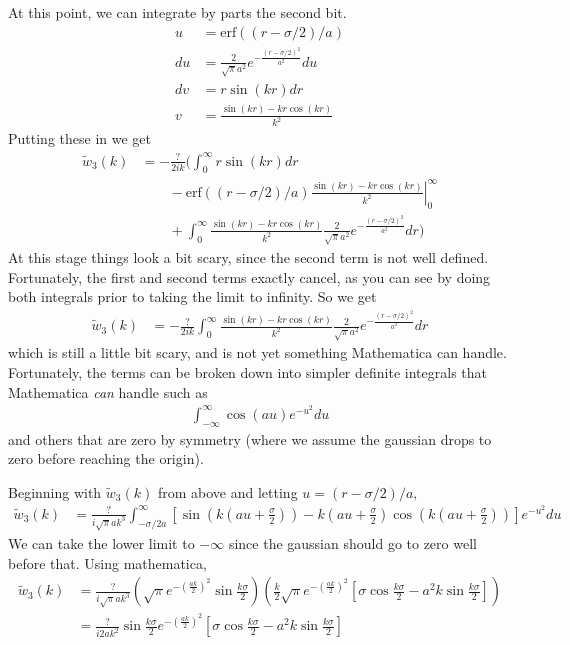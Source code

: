 \documentclass[letterpaper,twocolumn,amsmath,amssymb,prb]{revtex4-1}
\begin{document}
At this point, we can integrate by parts the second bit.
\begin{align}
  u &= \mathrm{erf}((r-\sigma/2)/a) \\
  du &= \frac{2}{\sqrt{\pi}a^2} e^{-\frac{(r-\sigma/2)^2}{a^2}} du \\
  dv &= r \sin(kr) dr \\
  v &= \frac{\sin(kr) - kr \cos(kr)}{k^2}
\end{align}
Putting these in we get
\begin{align}
  \tilde{w}_3(k)
  &=  -\frac{?}{2ik} \Big(
  \int_0^\infty r \sin(kr) dr\\ &\quad\quad
  -
  \left.\mathrm{erf}((r-\sigma/2)/a)\frac{\sin(kr) - kr
    \cos(kr)}{k^2}\right|_0^\infty\\ &\quad\quad
  +
  \int_0^\infty \frac{\sin(kr) - kr \cos(kr)}{k^2}\frac{2}{\sqrt{\pi}a^2} e^{-\frac{(r-\sigma/2)^2}{a^2}} dr
  \Big)
\end{align}
At this stage things look a bit scary, since the second term is not
well defined.  Fortunately, the first and second terms exactly cancel,
as you can see by doing both integrals prior to taking the limit to
infinity.  So we get
\begin{align}
  \tilde{w}_3(k)
  &=  -\frac{?}{2ik}\int_0^\infty \frac{\sin(kr) - kr
    \cos(kr)}{k^2}\frac{2}{\sqrt{\pi}a^2}
  e^{-\frac{(r-\sigma/2)^2}{a^2}} dr
\end{align}
which is still a little bit scary, and is not yet something
Mathematica can handle.  Fortunately, the terms can be broken down
into simpler definite integrals that Mathematica \emph{can} handle
such as
\begin{align}
  \int_{-\infty}^\infty \cos(a u)e^{-u^2}du
\end{align}
and others that are zero by symmetry (where we assume the gaussian
drops to zero before reaching the origin).
\begin{widetext}
Beginning with $\tilde{w}_3(k)$ from above and letting $u = (r-\sigma/2)/a,$
  \begin{align}
    \tilde{w}_3(k)
    &=  \frac{?}{i\sqrt{\pi}ak^3}\int_{-\sigma/2a}^\infty \left[ \sin(k(au+\frac{\sigma}{2}))
      - k(au + \frac{\sigma}{2}) \cos(k(au+\frac{\sigma}{2}))\right] e^{-u^2} du
  \end{align}
We can take the lower limit to $-\infty$ since the gaussian should go
to zero well before that. Using mathematica,
  \begin{align}
    \tilde{w}_3(k)
      &= \frac{?}{i\sqrt{\pi}ak^3}
    \left(\sqrt{\pi}e^{-\left(\frac{ak}{2}\right)^2}
      \sin{\frac{k\sigma}{2}} \right) \left( \frac{k}{2}
      \sqrt{\pi}e^{-\left(\frac{ak}{2}\right)^2} \left[\sigma
          \cos{\frac{k \sigma}{2}} - a^2 k \sin{\frac{k \sigma}{2}}
          \right] \right) \\
      &= \frac{?}{i2ak^2}\sin{\frac{k
          \sigma}{2}}e^{-\left(\frac{ak}{2}\right)^2} \left[\sigma
          \cos{\frac{k \sigma}{2}} - a^2 k \sin{\frac{k \sigma}{2}}\right]
  \end{align}
\end{widetext}
\end{document}
